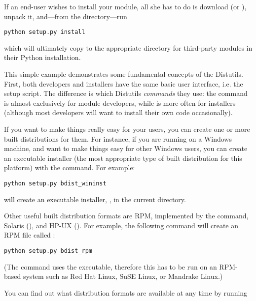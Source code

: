 \documentclass{howto}
\begin{document}
If an end-user wishes to install your  module, all she has
to do is download  (or ), unpack it,
and---from the  directory---run

\begin{verbatim}
python setup.py install
\end{verbatim}

which will ultimately copy  to the appropriate directory
for third-party modules in their Python installation.

This simple example demonstrates some fundamental concepts of the
Distutils. First, both developers and installers have the same basic
user interface, i.e. the setup script.  The difference is which
Distutils \emph{commands} they use: the  command is
almost exclusively for module developers, while  is
more often for installers (although most developers will want to install
their own code occasionally).

If you want to make things really easy for your users, you can create
one or more built distributions for them.  For instance, if you are
running on a Windows machine, and want to make things easy for other
Windows users, you can create an executable installer (the most
appropriate type of built distribution for this platform) with the
 command.  For example:

\begin{verbatim}
python setup.py bdist_wininst
\end{verbatim}

will create an executable installer, , in the
current directory.

Other useful built distribution formats are RPM, implemented by the
 command, Solaris 
(), and HP-UX 
().  For example, the following command will
create an RPM file called :

\begin{verbatim}
python setup.py bdist_rpm
\end{verbatim}

(The  command uses the  executable,
therefore this has to be run on an RPM-based system such as Red Hat
Linux, SuSE Linux, or Mandrake Linux.)

You can find out what distribution formats are available at any time by
running
\end{document}
